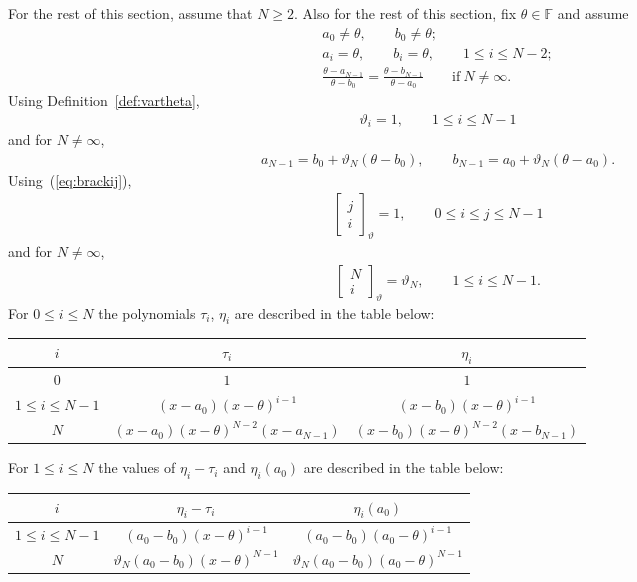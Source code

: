 \documentclass[pdftex]{sigma}
\numberwithin{equation}{section}
\begin{document}
For the rest of this section,
assume that $N\geq 2$. Also for the rest of this section,
fix $\theta \in \mathbb F$ and assume
\begin{gather}
a_0 \not=\theta, \qquad b_0 \not=\theta;\label{eq:c1}\\
a_i = \theta, \qquad b_i = \theta, \qquad 1 \leq i \leq N-2;\label{eq:c2}\\
\frac{\theta- a_{N-1}}{\theta-b_0} =
\frac{\theta- b_{N-1}}{\theta-a_0} \qquad \text{if} \ N\not=\infty.\label{eq:c3}
\end{gather}
Using Definition~\ref{def:vartheta},
\begin{gather*}
\vartheta_i = 1, \qquad 1 \leq i \leq N-1
\end{gather*}
and for $N\not=\infty$,
\begin{gather*}
a_{N-1} = b_0 +\vartheta_N (\theta-b_0), \qquad
b_{N-1} = a_0 +\vartheta_N (\theta-a_0).
\end{gather*}
Using~(\ref{eq:brackij}),
\begin{gather*}
\left[\begin{matrix} j \\
i \end{matrix} \right]_\vartheta = 1,
 \qquad 0 \leq i\leq j\leq N-1
\end{gather*}
and for $N\not=\infty$,
\begin{gather*}
\left[\begin{matrix} N \\
i \end{matrix} \right]_\vartheta = \vartheta_N,
 \qquad 1 \leq i \leq N-1.
\end{gather*}
For $0 \leq i \leq N$ the polynomials $\tau_i$, $\eta_i$
are described in the table below:
\begin{center}
\begin{tabular}[t]{c|cc}
 $i$ & $\tau_i$ & $\eta_i$
\\
\hline
$0$ &
$1$ & $1$
\\
$1 \leq i \leq N-1$ &
$(x-a_0)(x-\theta)^{i-1}$ &
$(x-b_0)(x-\theta)^{i-1}$
\\
$N$ &
$(x-a_0)(x-\theta)^{N-2}(x-a_{N-1})$ &
$(x-b_0)(x-\theta)^{N-2}(x-b_{N-1})$
\end{tabular}
\end{center}

For $1 \leq i \leq N$ the values of $\eta_i - \tau_i$
and $\eta_i(a_0)$ are described in the table below:
\begin{center}
\begin{tabular}[t]{c|cc}
 $i$ & $\eta_i - \tau_i$ & $\eta_i(a_0)$
\\
\hline
$1 \leq i \leq N-1$ &
$(a_0-b_0)(x-\theta)^{i-1}$ &
$(a_0-b_0)(a_0-\theta)^{i-1}$
\\
$N$ &
$\vartheta_N (a_0-b_0)(x-\theta)^{N-1}$ &
$\vartheta_N (a_0-b_0)(a_0-\theta)^{N-1}$
\end{tabular}
\end{center}
\end{document}
